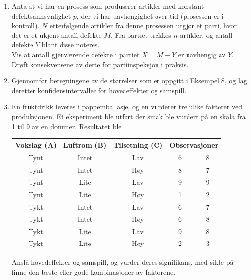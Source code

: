 \begin{enumerate}
\item Anta at vi har en prosess som produserer artikler med konstant
     defektsannsynlighet $p$, der vi har uavhengighet over tid (prosessen er i
     kontroll). $N$ etterfølgende artikler fra denne prosessen utgjør et
parti, hvor det er et ukjent antall defekte $M$. Fra partiet trekkes $n$ artikler,
     og antall defekte $Y$ blant disse noteres.\\
    Vis at antall gjenværende defekte i partiet $X=M-Y$ er uavhengig av $Y$.\\
    Drøft konsekvensene av dette for partiinspeksjon i praksis.
\item Gjennomfør beregningene av de størrelser som er oppgitt i Eksempel 8,
   og lag deretter konfidensintervaller for hovedeffekter og samspill.
\item En fruktdrikk leveres i pappemballasje, og en vurderer tre ulike faktorer
   ved produksjonen. Et eksperiment ble utført der smak ble vurdert på en 
   skala fra 1 til 9 av en dommer. Resultatet ble
   \begin{center}
   \begin{tabular}{ccccc}
    Vokslag (A) & Luftrom (B) & Tilsetning (C) &
                                 \multicolumn{2}{c}{Observasjoner} \\ \hline
       Tynt     & Intet      & Lav   &  6  &  8 \\
       Tynt     & Intet      & Høy&  8  &  7 \\
       Tynt     & Lite       & Lav   &  9  &  9 \\
       Tynt     & Lite       & Høy&  1  &  2 \\
       Tykt     & Intet      & Lav   &  6  &  7 \\
       Tykt     & Intet      & Høy&  6  &  8 \\
       Tykt     & Lite       & Lav   &  9  &  8 \\
       Tykt     & Lite       & Høy&  2  &  3 \\ \hline
   \end{tabular}
   \end{center}
   Anslå hovedeffekter og samspill, og vurder deres signifikans, med
   sikte på finne den beste eller gode kombinasjoner av faktorene.
\end{enumerate}
\normalsize
